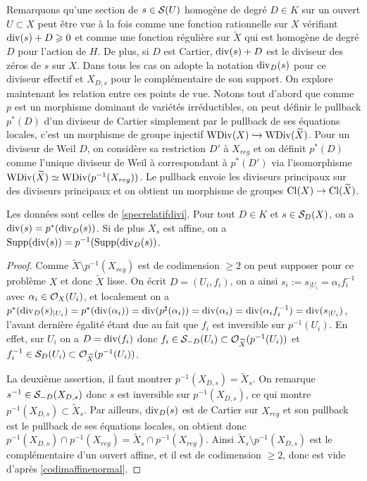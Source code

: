 Remarquons qu'une section de $s\in \mathcal{S}(U)$ homogène de degré $D\in K$ sur un ouvert $U\subset X$ peut être vue à la fois comme une fonction rationnelle sur $X$ vérifiant $\operatorname{div}(s)+D\geqslant 0$ et comme une fonction régulière sur $\widetilde{X}$ qui est homogène de degré $D$ pour l'action de $H$. De plus, si $D$ est Cartier, $\operatorname{div}(s)+D$ est le diviseur des zéros de $s$ sur $X$. Dans tous les cas on adopte la notation $\operatorname{div}_D(s)$ pour ce diviseur effectif et $X_{D,s}$ pour le complémentaire de son support. On explore maintenant les relation entre ces points de vue. Notons tout d'abord que comme $p$ est un morphisme dominant de variétés irréductibles, on peut définir le pullback $p^*(D)$ d'un diviseur de Cartier simplement par le pullback de ses équations locales, c'est un morphisme de groupe injectif $\operatorname{WDiv}(X)\xhookrightarrow{}\operatorname{WDiv}(\widetilde{X})$. Pour un diviseur de Weil $D$, on considère sa restriction $D'$ à $X_{reg}$ et on définit $p^*(D)$ comme l'unique diviseur de Weil à correspondant à $p^*(D')$ via l'isomorphisme $\operatorname{WDiv}(\widetilde{X})\simeq\operatorname{WDiv}(p^{-1}(X_{reg}))$. Le pullback envoie les diviseurs principaux sur des diviseurs principaux et on obtient un morphisme de groupes $\operatorname{Cl}(X)\rightarrow \operatorname{Cl}(\widetilde{X})$.

\begin{prop}\label{pstarprincipal}
Les données sont celles de \ref{specrelatifdivi}. Pour tout $D\in K$ et $s\in\mathcal{S}_D(X)$, on a $\operatorname{div}(s)=p^*(\operatorname{div}_D(s))$. Si de plus $X_s$ est affine, on a $\operatorname{Supp}(\operatorname{div}(s))=p^{-1}(\operatorname{Supp}(\operatorname{div}_D(s))$.
\end{prop}
\begin{proof}
Comme $\widetilde{X}\setminus p^{-1}(X_{reg})$ est de codimension $\geq 2$ on peut supposer pour ce problème $X$ et donc $\widetilde{X}$ lisse. On écrit $D=(U_i, f_i)$, on a ainsi $s_i:=s_{|U_i}=\alpha_i f_i^{-1}$ avec $\alpha_i\in \mathcal{O}_X(U_i)$, et localement on a $p^*(\operatorname{div}_D(s)_{|U_i})=p^*(\operatorname{div}(\alpha_i))=\operatorname{div}(p^\sharp(\alpha_i))=\operatorname{div}(\alpha_i)=\operatorname{div}(\alpha_i f_i^{-1})=\operatorname{div}(s_{|U_i})$, l'avant dernière égalité étant due au fait que $f_i$ est inversible sur $p^{-1}(U_i)$. En effet, sur $U_i$ on a $D=\operatorname{div}(f_i)$ donc $f_i\in \mathcal{S}_{-D}(U_i)\subset\mathcal{O}_{\widetilde{X}}(p^{-1}(U_i))$ et $f_i^{-1}\in \mathcal{S}_D(U_i)\subset\mathcal{O}_{\widetilde{X}}(p^{-1}(U_i))$.

La deuxième assertion, il faut montrer $p^{-1}(X_{D,s})=\widetilde{X}_s$. On remarque $s^{-1}\in \mathcal{S}_{-D}(X_{D,s})$ donc $s$ est inversible sur $p^{-1}(X_{D,s})$, ce qui montre $p^{-1}(X_{D,s})\subset \widetilde{X}_s$. Par ailleurs, $\operatorname{div}_D(s)$ est de Cartier sur $X_{reg}$ et son pullback est le pullback de ses équations locales, on obtient donc $p^{-1}(X_{D,s})\cap p^{-1}(X_{reg})=\widetilde{X}_s \cap p^{-1}(X_{reg})$. Ainsi $\widetilde{X}_s \setminus p^{-1}(X_{D,s})$ est le complémentaire d'un ouvert affine, et il est de codimension $\geq 2$, donc est vide d'après \ref{codimaffinenormal}.
\end{proof}

